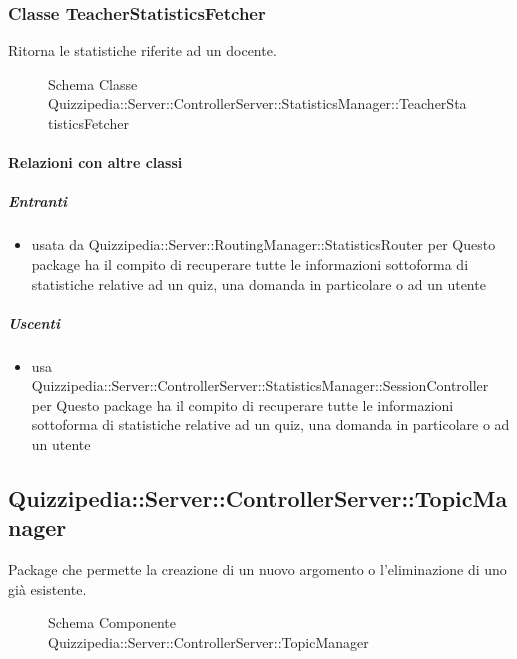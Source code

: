 \subsubsection{Classe TeacherStatisticsFetcher}
Ritorna le statistiche riferite ad un docente.
\begin{figure}[H]
\centering
\noindent{}
\caption[Schema Classe TeacherStatisticsFetcher]{Schema Classe Quizzipedia::Server::ControllerServer::StatisticsManager::TeacherStatisticsFetcher}
\end{figure}
\paragraph{Relazioni con altre classi}
\subparagraph{Entranti}
\begin{itemize}
\item usata da Quizzipedia::Server::RoutingManager::StatisticsRouter per Questo package ha il compito di recuperare tutte le informazioni sottoforma di statistiche relative ad un quiz, una domanda in particolare o ad un utente
\end{itemize}
\subparagraph{Uscenti}
\begin{itemize}
\item usa Quizzipedia::Server::ControllerServer::StatisticsManager::SessionController per Questo package ha il compito di recuperare tutte le informazioni sottoforma di statistiche relative ad un quiz, una domanda in particolare o ad un utente
\end{itemize}
\subsection{Quizzipedia::Server::ControllerServer::TopicManager}
Package che permette la creazione di un nuovo argomento o l'eliminazione di uno già esistente.
\begin{figure}[H]
\centering
\noindent{}
\caption[Schema Componente Quizzipedia::Server::ControllerServer::TopicManager]{Schema Componente Quizzipedia::Server::ControllerServer::TopicManager}
\end{figure}
